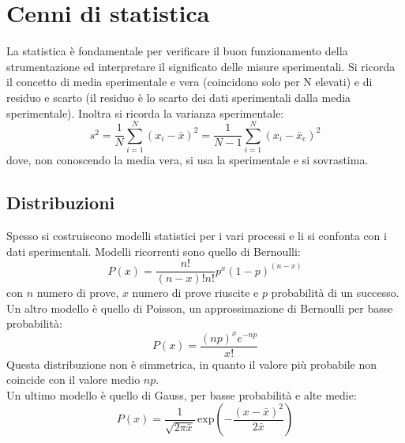 \chapter{Cenni di statistica}
La statistica \`e fondamentale per verificare il buon funzionamento della strumentazione ed interpretare il significato delle misure sperimentali.
Si ricorda il concetto di media sperimentale e vera (coincidono solo per N elevati) e di residuo e scarto (il residuo \`e lo scarto dei dati sperimentali
dalla media sperimentale).
Inoltra si ricorda la varianza sperimentale:
\begin{equation*}
s^2 = \frac{1}{N} \sum_{i=1}^N (x_i - \bar{x})^2 = \frac{1}{N-1} \sum_{i=1}^N (x_i - \bar{x}_e)^2
\end{equation*}
dove, non conoscendo la media vera, si usa la sperimentale e si sovrastima.
\section{Distribuzioni}
Spesso si costruiscono modelli statistici per i vari processi e li si confonta con i dati sperimentali.
Modelli ricorrenti sono quello di Bernoulli:
\begin{equation*}
P(x) = \frac{n!}{(n-x)!n!} p^x (1-p)^{(n-x)}
\end{equation*}
con $n$ numero di prove, $x$ numero di prove riuscite e $p$ probabilit\`a di un successo.\\
Un altro modello \`e quello di Poisson, un approssimazione di Bernoulli per basse probabilit\`a:
\begin{equation*}
P(x) = \frac{(np)^{x} e^{-np}}{x!}
\end{equation*}
Questa distribuzione non \`e simmetrica, in quanto il valore pi\`u probabile non coincide con il valore medio $np$.\\
Un ultimo modello \`e quello di Gauss, per basse probabilit\`a e alte medie:
\begin{equation*}
P(x) = \frac{1}{\sqrt{2\pi \bar{x}}}\,\text{exp}\left(-\frac{(x-\bar{x})^2}{2\bar{x}}\right)
\end{equation*}
